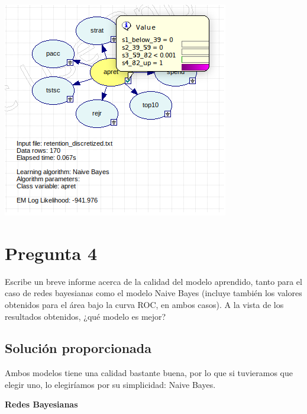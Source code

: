 \documentclass{article}
\begin{document}
\begin{center}
\includegraphics[scale=0.5]{images/ej3.png}
\end{center}

\section{Pregunta 4}

Escribe un breve informe acerca de la calidad del modelo aprendido, tanto para el caso de redes bayesianas como el modelo Naive Bayes (incluye también los valores obtenidos para el área bajo la curva ROC, en ambos casos). A la vista de los resultados obtenidos, ¿qué modelo es mejor?

\subsection{Solución proporcionada}

Ambos modelos tiene una calidad bastante buena, por lo que si tuvieramos que elegir uno, lo elegiríamos por su simplicidad: Naive Bayes.

\newpage
\textbf{Redes Bayesianas}
\end{document}
